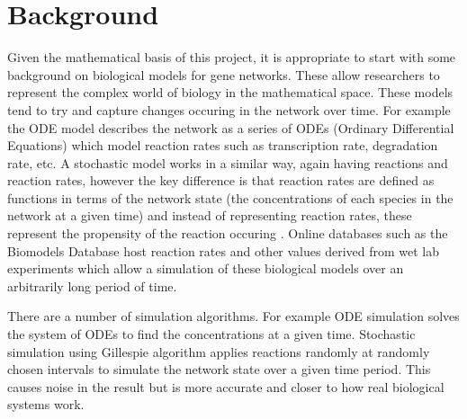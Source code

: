 \documentclass{article}
\begin{document}
	
	
	\section{Background}
	
	
	\par Given the mathematical basis of this project, it is appropriate to start with some background on biological models for gene networks. These allow researchers to represent the complex world of biology in the mathematical space. These models tend to try and capture changes occuring in the network over time. For example the ODE model describes the network as a series of ODEs (Ordinary Differential Equations) which model reaction rates such as transcription rate, degradation rate, etc\cite{sim_tutorial}. A stochastic model works in a similar way, again having reactions and reaction rates, however the key difference is that reaction rates are defined as functions in terms of the network state (the concentrations of each species in the network at a given time) and instead of representing reaction rates, these represent the propensity of the reaction occuring \cite{sim_tutorial}. Online databases such as the Biomodels Database \cite{biomodels} host reaction rates and other values derived from wet lab experiments which allow a simulation of these biological models over an arbitrarily long period of time.
	
	\par There are a number of simulation algorithms. For example ODE simulation solves the system of ODEs to find the concentrations at a given time. Stochastic simulation using Gillespie algorithm\cite{gillespie_original} applies reactions randomly at randomly chosen intervals to simulate the network state over a given time period. This causes noise in the result but is more accurate and closer to how real biological systems work.
	
\end{document}

